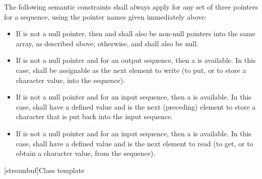 \pnum
The following semantic constraints shall always apply for any set of
three pointers for a sequence, using the pointer names given immediately above:
\begin{itemize}
\item
If  is not a null pointer, then
 and  shall also be non-null pointers
into the same
array, as described above; otherwise,  and
 shall also be null.
\item
If  is not a null pointer and
for an output sequence, then a
is available.
In this case,
shall be assignable as the
next element to write
(to put, or to store a character value, into the sequence).
\item
If  is not a null pointer and
 for an input sequence,
then a
is available.
In this case,
shall have a defined value and is the next (preceding) element
to store a character that is put back into the input sequence.
\item
If  is not a null pointer and
 for an input sequence,
then a
is available.
In this case,
shall have a defined value
and is the next element to read
(to get, or to obtain a character value, from the sequence).
\end{itemize}

[streambuf]{Class template }


